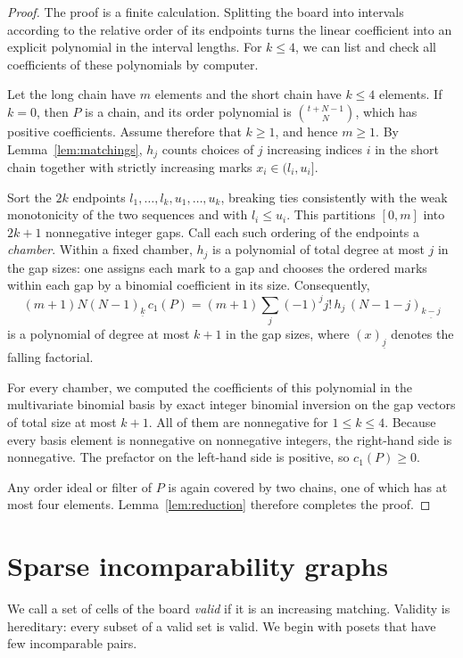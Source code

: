 \documentclass[11pt]{amsart}
\theoremstyle{remark}
\numberwithin{equation}{section}
\newcommand{\lin}{c_1}
\begin{document}
\begin{proof}
The proof is a finite calculation. Splitting the board into intervals
according to the relative order of its endpoints turns the linear coefficient into an
explicit polynomial in the interval lengths. For $k\le4$, we can list and check
all coefficients of these polynomials by computer.

Let the long chain have $m$ elements and the short chain have $k\le4$ elements.
If $k=0$, then $P$ is a chain, and its order polynomial is $\binom{t+N-1}{N}$,
which has positive coefficients. Assume therefore that $k\ge1$, and hence
$m\ge1$. By Lemma~\ref{lem:matchings}, $h_j$ counts choices of $j$ increasing
indices $i$ in the short chain together with strictly increasing marks
$x_i\in(l_i,u_i]$.

Sort the $2k$ endpoints $l_1,\dots,l_k,u_1,\dots,u_k$, breaking ties
consistently with the weak monotonicity of the two sequences and with
$l_i\le u_i$. This partitions $[0,m]$ into $2k+1$ nonnegative integer gaps.
Call each such ordering of the endpoints a \emph{chamber}. Within a fixed
chamber, $h_j$ is a polynomial of total degree at most $j$ in the gap sizes:
one assigns each mark to a gap and chooses the ordered marks within each gap by
a binomial coefficient in its size. Consequently,
\[
 (m+1)N(N-1)_{\underline k}\,\lin(P)
 =(m+1)\sum_j(-1)^j j!\,h_j\,(N-1-j)_{\underline{k-j}}
\]
is a polynomial of degree at most $k+1$ in the gap sizes, where
$(x)_{\underline j}$ denotes the falling factorial.

For every chamber, we computed the coefficients of this polynomial in the
multivariate binomial basis by exact integer binomial inversion on the gap
vectors of total size at most $k+1$. All of them are nonnegative for
$1\le k\le4$. Because every basis element is nonnegative on
nonnegative integers, the right-hand side is nonnegative. The prefactor on the
left-hand side is positive, so $\lin(P)\ge0$.

Any order ideal or filter of $P$ is again covered by two chains, one of which
has at most four elements. Lemma~\ref{lem:reduction} therefore completes the
proof.
\end{proof}

\section{Sparse incomparability graphs}\label{sec:sparse}

We call a set of cells of the board \emph{valid} if it is an increasing
matching. Validity is hereditary: every subset of a valid set is
valid. We begin with posets that have few incomparable pairs.
\end{document}
